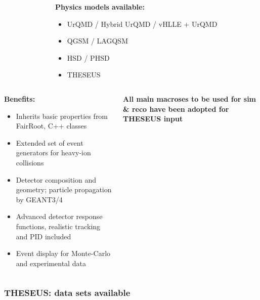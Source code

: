 \documentclass[dvipsnames] {beamer}
\begin{document}
\begin{frame}[shrink=35]
\begin{columns}[c]
\begin{block}{}
\begin{figure}[H]
      \end{figure}
    \end{block}
    \begin{block}{\bf \centering Physics models available: }
      \begin{itemize}
      \item UrQMD / Hybrid UrQMD / vHLLE + UrQMD
      \item QGSM / LAGQSM
      \item HSD / PHSD
      \item {\Large {\color{red} THESEUS}}
      \end{itemize}
    \end{block}
  \end{columns}
  \begin{columns}[c]
  
    \begin{block}{\bf \centering Benefits:}
      {\small 
      \begin{itemize}
      \item Inherits basic properties from FairRoot, C++ classes
      \item Extended set of event generators for heavy-ion collisions
      \item Detector composition and geometry; particle propagation by GEANT3/4
      \item Advanced detector response functions, realistic tracking and PID included
      \item Event display for Monte-Carlo and experimental data 
      \end{itemize}
      }
    \end{block}

    \begin{block}{}
      \begin{center}
        {\Large \color{red} \bf All main macroses to be used for sim \& reco have been adopted for THESEUS input}
      \end{center}
    \end{block}
  \end{columns}
 \end{frame}

 \begin{frame}
   \frametitle{\bf \centering THESEUS: data sets available}
 \end{frame}
\end{document}

